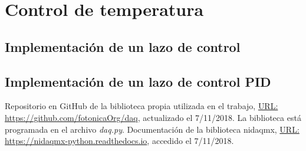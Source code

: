 \documentclass[a4paper,11pt]{article}
\begin{document}
\section{Control de temperatura}
\label{sec:control_temperatura}

\subsection{Implementación de un lazo de control}

\subsection{Implementación de un lazo de control PID}




\clearpage

\begin{thebibliography}{99}

	 Repositorio en GitHub de la biblioteca propia utilizada en el trabajo, \href{https://github.com/fotonicaOrg/daq}{URL: https://github.com/fotonicaOrg/daq}, actualizado el 7/11/2018. La biblioteca está programada en el archivo \emph{daq.py}.
	 Documentación de la biblioteca nidaqmx, \href{https://nidaqmx-python.readthedocs.io}{URL: https://nidaqmx-python.readthedocs.io}, accedido el 7/11/2018.


\end{thebibliography}
\end{document}
